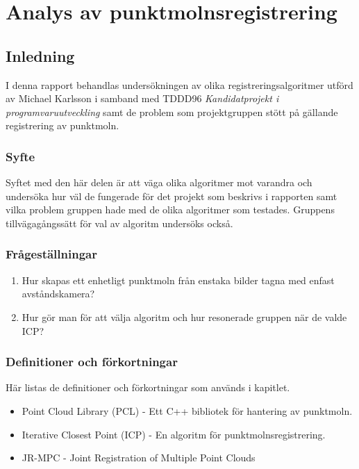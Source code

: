\chapter{Analys av punktmolnsregistrering}
\label{cha:indiv-report-karlsson}


\section{Inledning}
\label{sec:introduction-karlsson}

I denna rapport behandlas undersökningen av olika registreringsalgoritmer utförd av Michael Karlsson i samband med TDDD96 \textit{Kandidatprojekt i programvaruutveckling} samt de problem som projektgruppen stött på gällande registrering av punktmoln.

\subsection{Syfte}
\label{sec:purpose-karlsson}

Syftet med den här delen är att väga olika algoritmer mot varandra och undersöka hur väl de fungerade för det projekt som beskrivs i rapporten samt vilka problem gruppen hade med de olika algoritmer som testades. Gruppens tillvägagångssätt för val av algoritm undersöks också.


\subsection{Frågeställningar}
\label{sec:issue-karlsson}

\begin{enumerate}
	\item Hur skapas ett enhetligt punktmoln från enstaka bilder tagna med en\newline  fast avståndskamera?
	\item Hur gör man för att välja algoritm och hur resonerade gruppen när de valde ICP?	
\end{enumerate}

\subsection{Definitioner och förkortningar}
\label{sec:definitions-acronyms-karlsson}

Här listas de definitioner och förkortningar som används i kapitlet.

\begin{itemize}
	\item Point Cloud Library (PCL) \cite{pcl_home} - Ett C++ bibliotek för hantering av punktmoln.
	\item Iterative Closest Point (ICP) - En algoritm för punktmolnsregistrering.
	\item JR-MPC \cite{Evangelidis-ECCV-2014} - Joint Registration of Multiple Point Clouds
\end{itemize}


